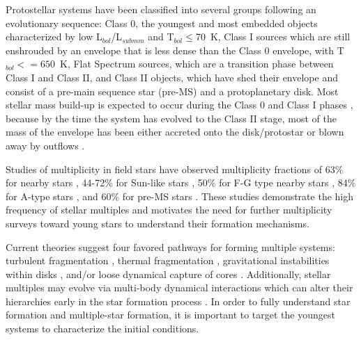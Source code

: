 \documentclass[twocolumn, 12pt]{aastex63}
\newcommand{\ab}{$\sim$}
\newcommand{\tbol}{T$_{bol}$}
\begin{document}
Protostellar systems have been classified into several groups following an evolutionary sequence: Class 0, the youngest and most embedded objects characterized by low L$_{bol}$/L$_{submm}$ \citep[$<5\times10^{-3}$; ][]{1993ApJ...406..122A} and \tbol\space$\le$70~K, Class I sources which are still enshrouded by an envelope that is less dense than the Class 0 envelope, with T$_{bol}<=650$~K, Flat Spectrum sources, which are a  transition phase between Class I and Class II, and Class II objects, which have shed their envelope and consist of a pre-main sequence star (pre-MS) and a protoplanetary disk. Most stellar mass build-up is expected to occur during the Class 0 and Class I phases \citep[$<5\times10^{5}$~yr; e.g.][]{2018arXiv180711262K,1987IAUS..115....1L}, because by the time the system has evolved to the Class II stage, most of the mass of the envelope has been either accreted onto the disk/protostar or blown away by outflows \citep[][]{2006ApJ...646.1070A, 2014ApJ...784...61O}.

Studies of multiplicity in field stars have observed multiplicity fractions of 63\% for nearby stars \citep[][]{1962AJ.....67R.590W}, 44-72\% for Sun-like stars \citep[][]{1983ARAA..21..343A, 2010ApJS..190....1R}, 50\% for F-G type nearby stars \citep[][]{1991AA...248..485D}, 84\% for A-type stars \citep[][]{2017ApJS..230...15M}, and 60\% for pre-MS stars \citep[][]{1994ARAA..32..465M}. These studies demonstrate the high frequency of stellar multiples and motivates the need for further multiplicity surveys toward young stars to understand their formation mechanisms.

Current theories suggest four favored pathways for forming multiple systems: turbulent fragmentation \citep[on scales \ab1000s of au; e.g.][]{2004ApJ...617..559P, 2004ApJ...600..769F}, thermal fragmentation \citep[on scales \ab1000s of au; e.g.][]{2010ApJ...725.1485O, 2013ApJ...764..136B}, gravitational instabilities within disks \citep[on scales \ab100s of au; e.g.][]{1989ApJ...347..959A, 2009MNRAS.392..413S, 2010ApJ...708.1585K}, and/or loose dynamical capture of cores \citep[\ab10$^{4-5}$~au scales][]{2002MNRAS.336..705B, 2019ApJ...887..232L}. Additionally, stellar multiples may evolve via multi-body dynamical interactions which can alter their hierarchies early in the star formation process \citep{2002MNRAS.336..705B, 2010MNRAS.404..721M, 2012Natur.492..221R}. In order to fully understand star formation and multiple-star formation, it is important to target the youngest systems to characterize the initial conditions.
\end{document}
